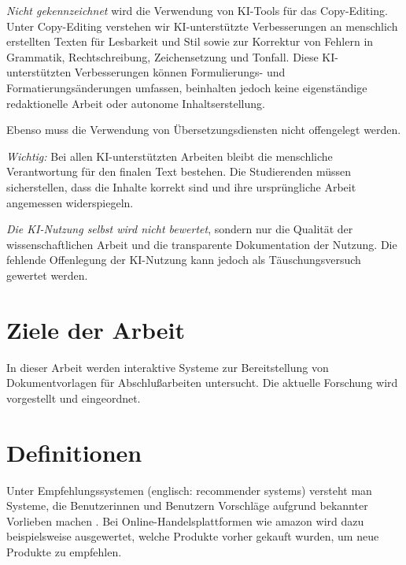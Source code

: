 \documentclass[12pt,        %
  english,ngerman,          %
  paper=a4,                 %
  captions=tablesignature,  %
  listof=numbered,          %
  bibliography=totoc,       %
  headings=small,           %
  headinclude=false,        %
  footinclude=false,        %
  parskip=half-,            %
  oneside,                  %
  DIV=12                    %
  ]{scrbook}                %
\begin{document}
  
\textit{Nicht gekennzeichnet} wird die Verwendung von KI-Tools für das Copy-Editing. Unter Copy-Editing verstehen wir KI-unterstützte Verbesserungen an menschlich erstellten Texten für Lesbarkeit und Stil sowie zur Korrektur von Fehlern in Grammatik, Rechtschreibung, Zeichensetzung und Tonfall. Diese KI-unterstützten Verbesserungen können Formulierungs- und Formatierungsänderungen umfassen, beinhalten jedoch keine eigenständige redaktionelle Arbeit oder autonome Inhaltserstellung.

Ebenso muss die Verwendung von Übersetzungsdiensten nicht offengelegt werden.
  
\textit{Wichtig:} Bei allen KI-unterstützten Arbeiten bleibt die menschliche Verantwortung für den finalen Text bestehen. Die Studierenden müssen sicherstellen, dass die Inhalte korrekt sind und ihre ursprüngliche Arbeit angemessen widerspiegeln.
    
\textit{Die KI-Nutzung selbst wird nicht bewertet}, sondern nur die Qualität der wissenschaftlichen Arbeit und die transparente Dokumentation der Nutzung. Die fehlende Offenlegung der KI-Nutzung kann jedoch als Täuschungsversuch gewertet werden.

\section{Ziele der Arbeit}\label{sec:goals}


In dieser Arbeit werden interaktive Systeme zur Bereitstellung von Dokumentvorlagen für Abschlußarbeiten untersucht. Die aktuelle Forschung wird vorgestellt und eingeordnet.

\section{Definitionen}\label{sec:definitions}


Unter Empfehlungssystemen (englisch: recommender systems) versteht man Systeme, die Benutzerinnen und Benutzern Vorschläge aufgrund bekannter Vorlieben machen \cite{herczeg-2009-software_ergonomie}. Bei Online-Handelsplattformen wie amazon wird dazu beispielsweise ausgewertet, welche Produkte vorher gekauft wurden, um neue Produkte zu empfehlen.
\end{document}
